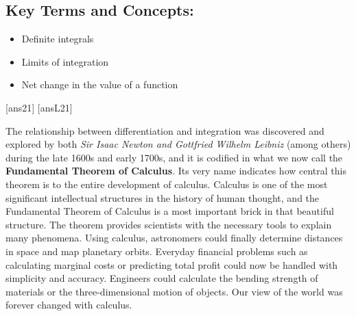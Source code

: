 \begin{framed}
\begin{itemize}
\end{itemize}
\subsection*{Key Terms and Concepts:} 

\begin{multicols}{2}
\begin{itemize}
    \item Definite integrals
    \item Limits of integration
    \item Net change in the value of a function
\end{itemize}
\end{multicols}
\end{framed}

\newpage
[ans21]
[ansL21]

\noindent The relationship between differentiation and integration was discovered and explored by both \emph{Sir Isaac Newton and Gottfried Wilhelm Leibniz} (among others) during the late 1600s and early 1700s, and it is codified in what we now call the \textbf{Fundamental Theorem of Calculus}. Its very name indicates how central this theorem is to the entire development of calculus. Calculus is one of the most significant intellectual structures in the history of human thought, and the Fundamental Theorem of Calculus is a most important brick in that beautiful structure. The theorem provides scientists with the necessary tools to explain many phenomena. Using calculus, astronomers could finally determine distances in space and map planetary orbits. Everyday financial problems such as calculating marginal costs or predicting total profit could now be handled with simplicity and accuracy. Engineers could calculate the bending strength of materials or the three-dimensional motion of objects. Our view of the world was forever changed with calculus.\\


